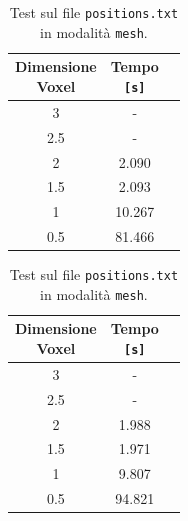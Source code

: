 \begin{center}
  \begin{table}[h]
    \begin{minipage}{.5\linewidth}
      \vspace{0pt}
      \begin{tabular}{ccc}
        \toprule
          \shortstack{Dimensione\\ Voxel} & \shortstack{Tempo \\\texttt{[s]}} \\
        \midrule
          3   & - \\
          2.5 & - \\
          2   & 2.090 \\
          1.5 & 2.093 \\
          1   & 10.267 \\
          0.5 & 81.466 \\
        \bottomrule
      \end{tabular}
      \caption{Test sul file \texttt{positions.txt} in modalità \texttt{box}.}
      \label{tab:positionsBox}
    \end{minipage}
    \begin{minipage}{.5\linewidth}
      \vspace{0pt}\raggedright
      \begin{tabular}{ccc}
        \toprule
          \shortstack{Dimensione\\ Voxel} & \shortstack{Tempo \\\texttt{[s]}}\\
        \midrule
          3   & - \\
          2.5 & -  \\
          2   & 1.988  \\
          1.5 & 1.971 \\
          1   & 9.807  \\
          0.5 & 94.821 \\
        \bottomrule
      \end{tabular}
      \caption{Test sul file \texttt{positions.txt} in modalità \texttt{mesh}.}      \label{tab:positionsMesh}
    \end{minipage}


\end{table}
\end{center}
